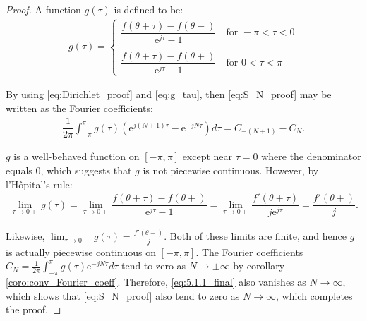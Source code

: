 \begin{proof}
	A function $g(\tau)$ is defined to be:
	\begin{align} \label{eq:g_tau}
		g(\tau) =
		\begin{cases}
			\dfrac{f(\theta + \tau) - f(\theta-)}{\text{e}^{j				\tau}-1} \quad \text{for } -\pi < \tau < 0 \\ \\
			\dfrac{f(\theta + \tau) - f(\theta+)}{\text{e}^{j				\tau}-1} \quad \text{for } 0 < \tau < \pi
		\end{cases}
	\end{align}	
	
	By using \eqref{eq:Dirichlet_proof} and \eqref{eq:g_tau}, 		then \eqref{eq:S_N_proof} may be written as the Fourier 		coefficients:
	\begin{align} \label{eq:5.1.1_final}
		\dfrac{1}{2\pi} \int_{-\pi}^\pi g(\tau) \left(\text{e}			^{j(N+1)\tau} - \text{e}^{-jN\tau}\right) d\tau = C_{-			(N+1)} - C_N.
	\end{align}
	
	$g$ is a well-behaved function on $[-\pi,\pi]$ except near 		$\tau = 0$ where the denominator equals 0, which suggests 		that $g$ is not piecewise continuous. However, by 				l'Hôpital's rule:
	\begin{align*}
		\lim_{\tau \to 0+} g(\tau) = \lim_{\tau \to 0+} 				\dfrac{f(\theta + \tau) - f(\theta+)}{\text{e}^{j				\tau}-1} = \lim_{\tau \to 0+} \dfrac{f'(\theta + \tau)}			{j\text{e}^{j\tau}} = \dfrac{f'(\theta+)}{j}.
	\end{align*}
	
	Likewise, $\displaystyle{\lim_{\tau \to 0-}} g(\tau) = 			\frac{f'(\theta-)}{j}$. Both of these limits are finite, 		and hence $g$ is actually piecewise continuous on $[-\pi,		\pi]$. The Fourier coefficients $C_N = \frac{1}{2\pi} 			\int_{-\pi}^\pi g(\tau)\text{e}^{-jN\tau} d\tau$ tend to 		zero as $N 	\to \pm \infty$ by corollary 						\ref{coro:conv_Fourier_coeff}. 	Therefore,
	\eqref{eq:5.1.1_final} also vanishes as $N \to \infty$, 		which shows that \eqref{eq:S_N_proof} also tend to zero as 		$N \to \infty$, which completes the proof.
\end{proof}



